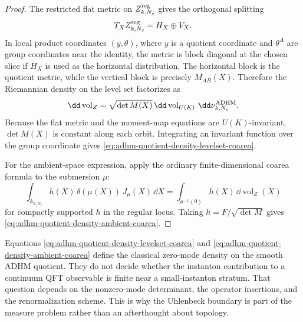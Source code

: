 \begin{proof}
The restricted flat metric on \(Z_{k,N_c}^{\rm reg}\) gives the orthogonal
splitting
\[
  T_XZ_{k,N_c}^{\rm reg}=H_X\oplus V_X.
\]
In local product coordinates \((y,\theta)\), where \(y\) is a quotient
coordinate and \(\theta^A\) are group coordinates near the identity, the
metric is block diagonal at the chosen slice if \(H_X\) is used as the
horizontal distribution.  The horizontal block is the quotient metric, while
the vertical block is precisely \(M_{AB}(X)\).  Therefore the Riemannian
density on the level set factorizes as
\[
  \dd\operatorname{vol}_{Z}
  =
  \sqrt{\det M(X)}\,
  \dd\operatorname{vol}_{U(K)}\,
  \dd\nu_{k,N_c}^{\rm ADHM}.
\]
Because the flat metric and the moment-map equations are \(U(K)\)-invariant,
\(\det M(X)\) is constant along each orbit.  Integrating an invariant
function over the group coordinate gives
\eqref{eq:adhm-quotient-density-levelset-coarea}.

For the ambient-space expression, apply the ordinary finite-dimensional
coarea formula to the submersion \(\mu\):
\[
  \int_{\mathbb A_{k,N_c}}
  h(X)\,\delta(\mu(X))\,J_\mu(X)\,\dd X
  =
  \int_{\mu^{-1}(0)} h(X)\,\dd\operatorname{vol}_{Z}(X)
\]
for compactly supported \(h\) in the regular locus.  Taking
\(h=F/\sqrt{\det M}\) gives
\eqref{eq:adhm-quotient-density-ambient-coarea}.
\end{proof}

\begin{remark}
\label{rem:adhm-density-versus-determinants}
Equations
\eqref{eq:adhm-quotient-density-levelset-coarea} and
\eqref{eq:adhm-quotient-density-ambient-coarea} define the classical
zero-mode density on the smooth ADHM quotient.  They do not decide whether
the instanton contribution to a continuum QFT observable is finite near a
small-instanton stratum.  That question depends on the nonzero-mode
determinant, the operator insertions, and the renormalization scheme.  This
is why the Uhlenbeck boundary is part of the measure problem rather than an
afterthought about topology.
\end{remark}

